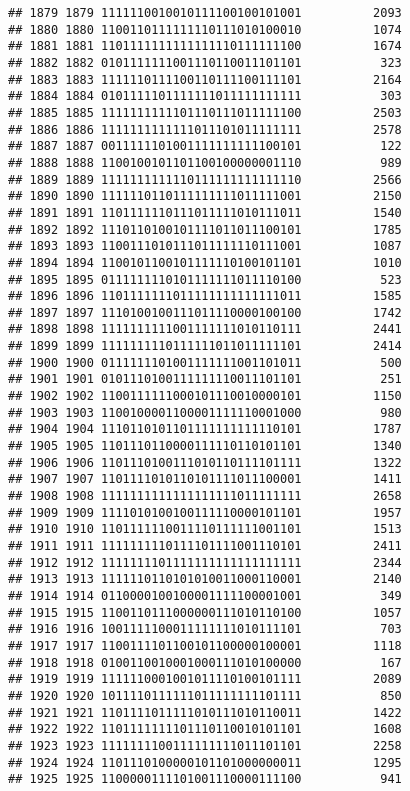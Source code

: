 \documentclass[]{article}
\begin{document}
\begin{verbatim}
## 1879 1879 1111110010010111100100101001          2093
## 1880 1880 1100110111111110111010100010          1074
## 1881 1881 1101111111111111110111111100          1674
## 1882 1882 0101111111001110110011101101           323
## 1883 1883 1111110111100110111100111101          2164
## 1884 1884 0101111101111111011111111111           303
## 1885 1885 1111111111101110111011111100          2503
## 1886 1886 1111111111111011101011111111          2578
## 1887 1887 0011111101001111111111100101           122
## 1888 1888 1100100101101100100000001110           989
## 1889 1889 1111111111110111111111111110          2566
## 1890 1890 1111110110111111111011111001          2150
## 1891 1891 1101111110111011111010111011          1540
## 1892 1892 1110110100101111011011100101          1785
## 1893 1893 1100111010111011111110111001          1087
## 1894 1894 1100101100101111110100101101          1010
## 1895 1895 0111111110101111111011110100           523
## 1896 1896 1101111111011111111111111011          1585
## 1897 1897 1110100100111011110000100100          1742
## 1898 1898 1111111111001111111010110111          2441
## 1899 1899 1111111110111111011011111101          2414
## 1900 1900 0111111101001111111001101011           500
## 1901 1901 0101110100111111110011101101           251
## 1902 1902 1100111111000101110010000101          1150
## 1903 1903 1100100001100001111110001000           980
## 1904 1904 1110110101101111111111110101          1787
## 1905 1905 1101110110000111110110101101          1340
## 1906 1906 1101110100111010110111101111          1322
## 1907 1907 1101111010110101111011100001          1411
## 1908 1908 1111111111111111111011111111          2658
## 1909 1909 1111010100100111110000101101          1957
## 1910 1910 1101111110011110111111001101          1513
## 1911 1911 1111111110111101111001110101          2411
## 1912 1912 1111111101111111111111111111          2344
## 1913 1913 1111110110101010011000110001          2140
## 1914 1914 0110000100100001111100001001           349
## 1915 1915 1100110111000000111010110100          1057
## 1916 1916 1001111100011111111010111101           703
## 1917 1917 1100111101100101100000100001          1118
## 1918 1918 0100110010001000111010100000           167
## 1919 1919 1111110001001011110100101111          2089
## 1920 1920 1011110111111011111111101111           850
## 1921 1921 1101111011111010111010110011          1422
## 1922 1922 1101111111101110110010101101          1608
## 1923 1923 1111111100111111111011101101          2258
## 1924 1924 1101110100000101101000000011          1295
## 1925 1925 1100000111101001110000111100           941

\end{verbatim}
\end{document}
